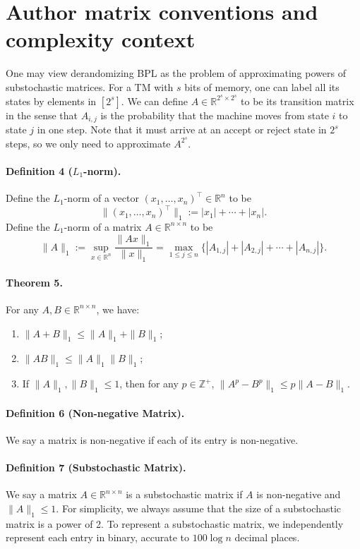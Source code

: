 \section*{Author matrix conventions and complexity context}
One may view derandomizing BPL as the problem of approximating powers of substochastic matrices. For a TM with $s$ bits of memory, one can label all its states by elements in $[2^s]$. We can define $A\in\mathbb R^{2^s\times2^s}$ to be its transition matrix in the sense that $A_{i,j}$ is the probability that the machine moves from state $i$ to state $j$ in one step. Note that it must arrive at an accept or reject state in $2^s$ steps, so we only need to approximate $A^{2^s}$.
\paragraph{Definition 4 ($L_1$-norm).} Define the $L_1$-norm of a vector $(x_1,\ldots,x_n)^\top\in\mathbb R^n$ to be
\[\|(x_1,\ldots,x_n)^\top\|_1:=|x_1|+\cdots+|x_n|.\]
Define the $L_1$-norm of a matrix $A\in\mathbb R^{n\times n}$ to be
\[\|A\|_1:=\sup_{x\in\mathbb R^n}\frac{\|Ax\|_1}{\|x\|_1}=\max_{1\le j\le n}\{|A_{1,j}|+|A_{2,j}|+\cdots+|A_{n,j}|\}.\]
\paragraph{Theorem 5.} For any $A,B\in\mathbb R^{n\times n}$, we have:
\begin{enumerate}\item $\|A+B\|_1\le\|A\|_1+\|B\|_1$;\item $\|AB\|_1\le\|A\|_1\|B\|_1$;\item If $\|A\|_1,\|B\|_1\le1$, then for any $p\in\mathbb Z^+$, $\|A^p-B^p\|_1\le p\|A-B\|_1$.\end{enumerate}
\paragraph{Definition 6 (Non-negative Matrix).} We say a matrix is non-negative if each of its entry is non-negative.
\paragraph{Definition 7 (Substochastic Matrix).} We say a matrix $A\in\mathbb R^{n\times n}$ is a substochastic matrix if $A$ is non-negative and $\|A\|_1\le1$.
For simplicity, we always assume that the size of a substochastic matrix is a power of 2. To represent a substochastic matrix, we independently represent each entry in binary, accurate to $100\log n$ decimal places.
